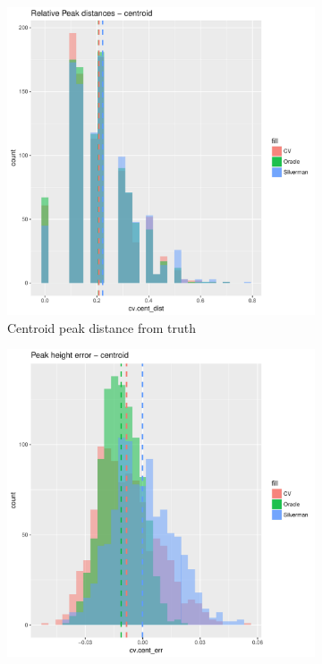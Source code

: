 \begin{figure}[htbp]
    \centering
    \begin{subfigure}[b]{0.45\textwidth}
    \includegraphics[width=\textwidth]{output/centroid-dist-histogram}
    \caption{Centroid peak distance from truth}
    \end{subfigure}
    \begin{subfigure}[b]{0.45\textwidth}
    \includegraphics[width=\textwidth]{output/centroid-height-histogram}

\end{subfigure}
\end{figure}
